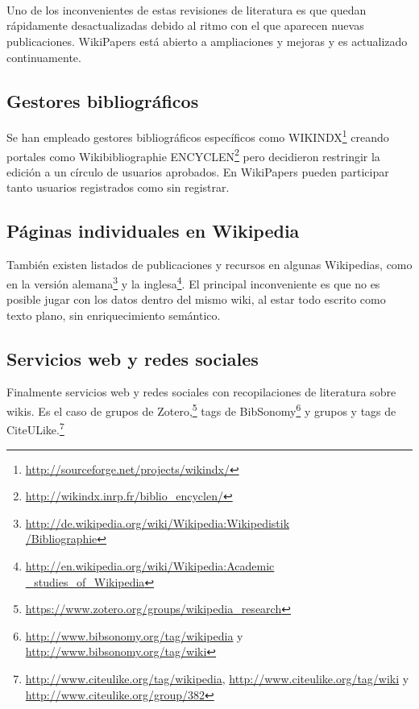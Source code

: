 \documentclass[11pt,twocolumn]{article}
\begin{document}
~\citep{martin2011}

~\citep{okoli2012}

~\citep{jullien2012}

Uno de los inconvenientes de estas revisiones de literatura es que quedan rápidamente desactualizadas debido al ritmo con el que aparecen nuevas publicaciones. WikiPapers está abierto a ampliaciones y mejoras y es actualizado continuamente.

\subsection{Gestores bibliográficos}
Se han empleado gestores bibliográficos específicos como WIKINDX\footnote{\href{http://sourceforge.net/projects/wikindx/}{http://sourceforge.net/projects/wikindx/}} creando portales como Wikibibliographie ENCYCLEN\footnote{\href{http://wikindx.inrp.fr/biblio_encyclen/}{http://wikindx.inrp.fr/biblio\_encyclen/}} pero decidieron restringir la edición a un círculo de usuarios aprobados. En WikiPapers pueden participar tanto usuarios registrados como sin registrar.


\subsection{Páginas individuales en Wikipedia}
También existen listados de publicaciones y recursos en algunas Wikipedias, como en la versión alemana\footnote{\href{http://de.wikipedia.org/wiki/Wikipedia:Wikipedistik/Bibliographie}{http://de.wikipedia.org/wiki/Wikipedia:Wikipedistik\\ /Bibliographie}} y la inglesa\footnote{\href{http://en.wikipedia.org/wiki/Wikipedia:Academic_studies_of_Wikipedia}{http://en.wikipedia.org/wiki/Wikipedia:Academic\\ \_studies\_of\_Wikipedia}}. El principal inconveniente es que no es posible jugar con los datos dentro del mismo wiki, al estar todo escrito como texto plano, sin enriquecimiento semántico.

\subsection{Servicios web y redes sociales}
Finalmente servicios web y redes sociales con recopilaciones de literatura sobre wikis. Es el caso de grupos de Zotero,\footnote{\href{https://www.zotero.org/groups/wikipedia_research}{https://www.zotero.org/groups/wikipedia\_research}} tags de BibSonomy\footnote{\href{http://www.bibsonomy.org/tag/wikipedia}{http://www.bibsonomy.org/tag/wikipedia} y \href{http://www.bibsonomy.org/tag/wiki}{http://www.bibsonomy.org/tag/wiki}} y grupos y tags de CiteULike.\footnote{\href{http://www.citeulike.org/tag/wikipedia}{http://www.citeulike.org/tag/wikipedia}, \href{http://www.citeulike.org/tag/wiki}{http://www.citeulike.org/tag/wiki} y \href{http://www.citeulike.org/group/382}{http://www.citeulike.org/group/382}}
\end{document}
